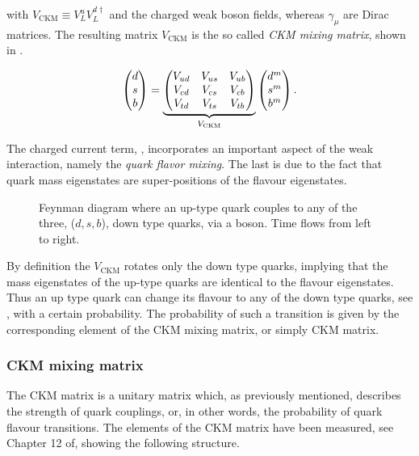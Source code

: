 \noindent with $V_{\text{CKM}} \equiv V^u_LV^{d\dagger}_L$ and \Wpm the charged weak boson fields, whereas $\gamma_\mu$ are Dirac matrices.
The resulting matrix $V_{\text{CKM}}$ is the so called {\it CKM mixing matrix}, shown in .

\begin{equation}
  \centering
  \begin{pmatrix} \dquark \\ \squark \\ \bquark  \end{pmatrix} =
  \underbrace{\begin{pmatrix} \Vud & \Vus & \Vub \\ \Vcd & \Vcs & \Vcb \\ \Vtd & \Vts & \Vtb \end{pmatrix}}_{V_{\text{CKM}}}
    \begin{pmatrix} \dquark^m \\ \squark^m \\ \bquark^m  \end{pmatrix}.
      \label{quark_field_rotation}
  \end{equation}

The charged current term, , incorporates an important aspect of the weak interaction,
namely the {\it quark flavor mixing}. The last is due to the fact that quark mass eigenstates are super-positions
of the flavour eigenstates.

\begin{figure}[h!]
  \centering
  {\sffamily }
  \caption{Feynman diagram where an up-type quark couples to any of the three, ($d,s,b$), down type quarks,
           via a \Wp boson. Time flows from left to right.}
  \label{QuarkMixing}
\end{figure}

\noindent By definition the $V_{\text{CKM}}$ rotates only the down type quarks, implying that
the mass eigenstates of the up-type quarks are identical to the flavour eigenstates. Thus an up type quark
can change its flavour to any of the down type quarks, see , with a certain probability.
The probability of such a transition is given by the corresponding element of the CKM mixing matrix, or simply CKM matrix.

\subsubsection{CKM mixing matrix}
The CKM matrix is a unitary matrix which, as previously mentioned, describes the strength of quark couplings,
or, in other words, the probability of quark flavour transitions. The elements of the CKM matrix have been measured, see \eg Chapter 12 of\cite{PDG},
showing the following structure.


